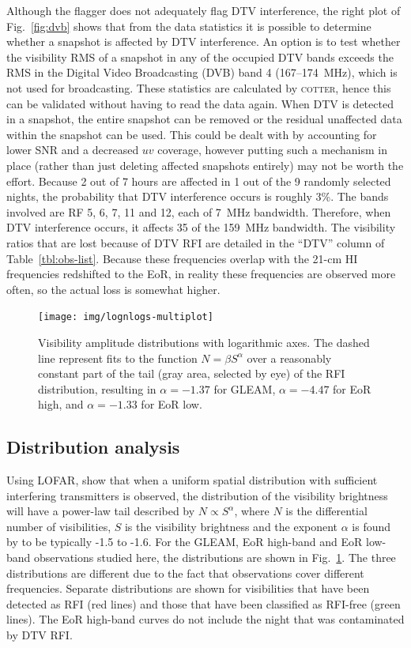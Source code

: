 \documentclass{pasa}
\begin{document}
Although the flagger does not adequately flag DTV interference, the right plot of Fig.~\ref{fig:dvb} shows that from the data statistics it is possible to determine whether a snapshot is affected by DTV interference. An option is to test whether the visibility RMS of a snapshot in any of the occupied DTV bands exceeds the RMS in the Digital Video Broadcasting (DVB) band 4 (167--174~MHz), which is not used for broadcasting. These statistics are calculated by \textsc{cotter}, hence this can be validated without having to read the data again. When DTV is detected in a snapshot, the entire snapshot can be removed or the residual unaffected data within the snapshot can be used. This could be dealt with by accounting for lower SNR and a decreased $uv$ coverage, however putting such a mechanism in place (rather than just deleting affected snapshots entirely) may not be worth the effort. Because 2 out of 7 hours are affected in 1 out of the 9 randomly selected nights, the probability that DTV interference occurs is roughly 3\%. The bands involved are RF 5, 6, 7, 11 and 12, each of 7~MHz bandwidth. Therefore, when DTV interference occurs, it affects 35 of the 159~MHz bandwidth. The visibility ratios that are lost because of DTV RFI are detailed in the ``DTV'' column of Table~\ref{tbl:obs-list}. Because these frequencies overlap with the 21-cm HI frequencies redshifted to the EoR, in reality these frequencies are observed more often, so the actual loss is somewhat higher.

\noindent\begin{figure}
\begin{center}\hspace*{-0.2cm}\texttt{[image: img/lognlogs-multiplot]}
\caption{Visibility amplitude distributions with logarithmic axes. The dashed line represent fits to the function $N=\beta S^\alpha$ over a reasonably constant part of the tail (gray area, selected by eye) of the RFI distribution, resulting in $\alpha=-1.37$ for GLEAM, $\alpha=-4.47$ for EoR high, and $\alpha=-1.33$ for EoR low.}
\label{fig:lognlogs}
\end{center}
\end{figure}

\subsection{Distribution analysis}
Using LOFAR, \citet{offringa-rfi-distributions} show that when a uniform spatial distribution with sufficient interfering transmitters is observed, the distribution of the visibility brightness will have a power-law tail described by $N\propto S^\alpha$, where $N$ is the differential number of visibilities, $S$ is the visibility brightness and the exponent $\alpha$ is found by \citet{offringa-rfi-distributions} to be typically -1.5 to -1.6. For the GLEAM, EoR high-band and EoR low-band observations studied here, the distributions are shown in Fig.~\ref{fig:lognlogs}. The three distributions are different due to the fact that observations cover different frequencies.  Separate distributions are shown for visibilities that have been detected as RFI (red lines) and those that have been classified as RFI-free (green lines). The EoR high-band curves do not include the night that was contaminated by DTV RFI.
\end{document}
